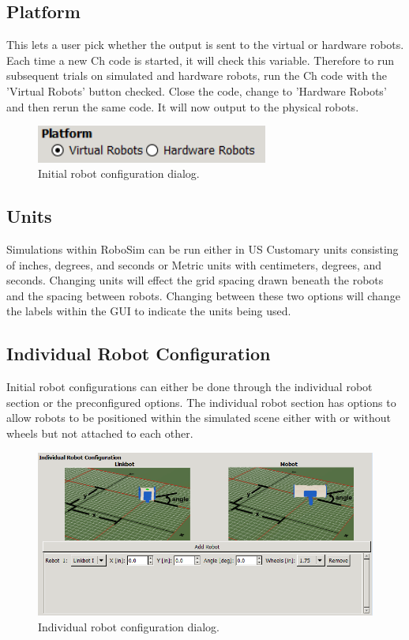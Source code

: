 \documentclass{article}
\begin{document}
\subsection{Platform}
This lets a user pick whether the output is sent to the virtual or hardware 
robots.  Each time a new Ch code is started, it will check this variable.
Therefore to run subsequent trials on simulated and hardware robots, run the Ch
code with the 'Virtual Robots' button checked.  Close the code, change to 'Hardware
Robots' and then rerun the same code.  It will now output to the physical
robots.
\begin{figure}[H]
	\begin{center}
		\includegraphics[width=3in]{images/platform}
	\end{center}
	\caption{Initial robot configuration dialog.}
	\label{fig:platform}
\end{figure}

\subsection{Units}
Simulations within RoboSim can be run either in US Customary units consisting of
inches, degrees, and seconds or Metric units with centimeters, degrees, and
seconds.  Changing units will effect the grid spacing drawn beneath the robots
and the spacing between robots.  Changing between these two options will
change the labels within the GUI to indicate the units being used.

\subsection{Individual Robot Configuration}
Initial robot configurations can either be done through the individual robot
section or the preconfigured options.  The individual robot section has options
to allow robots to be positioned within the simulated scene either with or
without wheels but not attached to each other.
\begin{figure}[H]
	\begin{center}
		\includegraphics[width=6in]{images/individual}
	\end{center}
	\caption{Individual robot configuration dialog.}
	\label{fig:config}
\end{figure}
\end{document}
